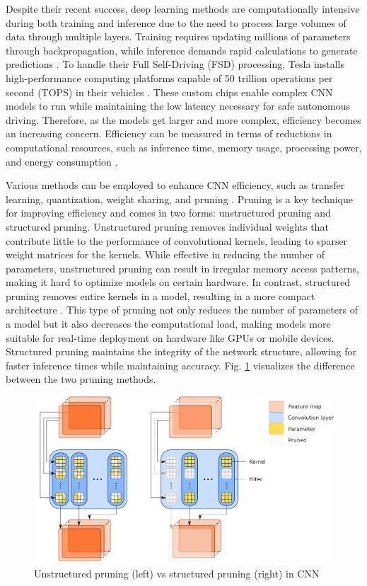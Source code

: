 \documentclass[journal,onecolumn,12pt]{IEEEtran}
\begin{document}
Despite their recent success, deep learning methods are computationally intensive during both training and inference due to the need to process large volumes of data through multiple layers. Training requires updating millions of parameters through backpropagation, while inference demands rapid calculations to generate predictions \cite{objDetect}. To handle their Full Self-Driving (FSD) processing, Tesla installs high-performance computing platforms capable of 50 trillion operations per second (TOPS) in their vehicles \cite{10588595}. These custom chips enable complex CNN models to run while maintaining the low latency necessary for safe autonomous driving. Therefore, as the models get larger and more complex, efficiency becomes an increasing concern. Efficiency can be measured in terms of reductions in computational resources, such as inference time, memory usage, processing power, and energy consumption \cite{electronics11060945}. 

Various methods can be employed to enhance CNN efficiency, such as transfer learning, quantization, weight sharing, and pruning \cite{HABIB20224244}. Pruning is a key technique for improving efficiency and comes in two forms: unstructured pruning and structured pruning. Unstructured pruning removes individual weights that contribute little to the performance of convolutional kernels, leading to sparser weight matrices for the kernels. While effective in reducing the number of parameters, unstructured pruning can result in irregular memory access patterns, making it hard to optimize models on certain hardware. In contrast, structured pruning removes entire kernels in a model, resulting in a more compact architecture \cite{beforehydra}. This type of pruning not only reduces the number of parameters of a model but it also decreases the computational load, making models more suitable for real-time deployment on hardware like GPUs or mobile devices. Structured pruning maintains the integrity of the network structure, allowing for faster inference times while maintaining accuracy. Fig. \ref{fig:pruning} visualizes the difference between the two pruning methods.

\begin{figure}
    \centering
    \captionsetup{justification=centering}
    \includegraphics[width=0.6\linewidth]{figures/pruning.PNG}
    \caption{Unstructured pruning (left) vs structured pruning (right) in CNN \cite{Tessier_2021}}
    \label{fig:pruning}
\end{figure}
\end{document}
